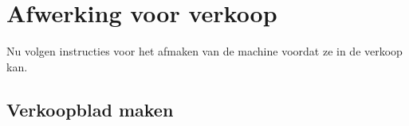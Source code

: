 \section{Afwerking voor verkoop}
Nu volgen instructies voor het afmaken van de machine voordat ze in de verkoop kan.
\subsection{Verkoopblad maken}
